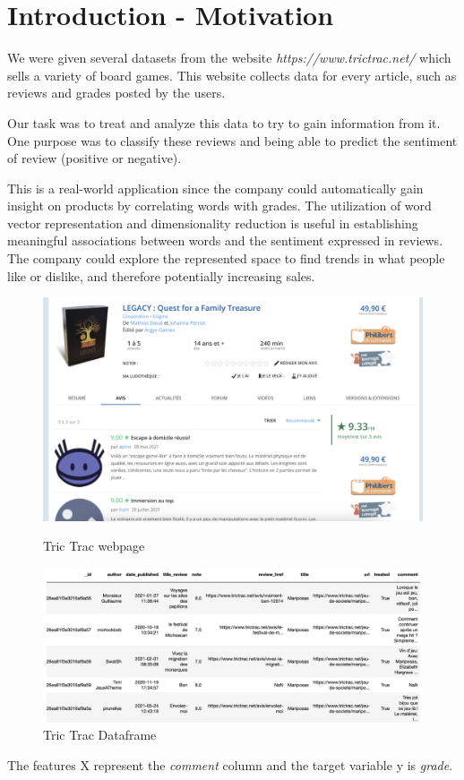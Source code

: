 \documentclass{article}
\begin{document}
\tableofcontents
\newpage
\section{Introduction - Motivation}

We were given several datasets from the website \textit{https://www.trictrac.net/} which sells a variety of board games. This website collects data for every article, such as reviews and grades posted by the users. 

Our task was to treat and analyze this data to try to gain information from it. One purpose was to classify these reviews and being able to predict the sentiment of review (positive or negative). 

This is a real-world application since the company could automatically gain insight on products by correlating words with grades.
The utilization of word vector representation and dimensionality reduction is useful in establishing meaningful associations between words and the sentiment expressed in reviews. The company could explore the represented space to find trends in what people like or dislike, and therefore potentially increasing sales.

\begin{figure}[H]
  \centering
  \begin{minipage}[t]{0.49\linewidth}
    \centering
    \includegraphics[width=\linewidth]{tric_trac_pic.png}
    \caption{Tric Trac webpage}
  \end{minipage}\hfill
  \begin{minipage}[t]{0.49\linewidth}
    \centering
    \includegraphics[width=\linewidth]{tric_trac_df.png}
    \caption{Tric Trac Dataframe}
  \end{minipage}
\end{figure}
The features X represent the \textit{comment} column and the target variable y is \textit{grade}.
\end{document}
